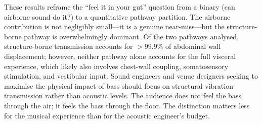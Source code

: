 These results reframe the ``feel it in your gut'' question from a binary
(can airborne sound do it?) to a quantitative pathway partition.  The
airborne contribution is not negligibly small---it is a genuine
near-miss---but the structure-borne pathway is overwhelmingly dominant.
Of the two pathways analysed, structure-borne transmission accounts for
$>{99.9}\%$ of abdominal wall displacement; however, neither pathway
alone accounts for the full visceral experience, which likely also
involves chest-wall coupling, somatosensory stimulation, and vestibular
input.  Sound engineers and venue designers seeking to maximise the
physical impact of bass should focus on structural vibration
transmission rather than acoustic levels.
The audience does not feel the bass through the air; it feels the bass
through the floor.  The distinction matters less for the musical
experience than for the acoustic engineer's budget.